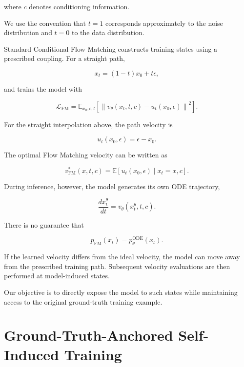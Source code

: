 \documentclass[11pt]{article}
\begin{document}
where $c$ denotes conditioning information.

We use the convention that $t=1$ corresponds approximately to the noise
distribution and $t=0$ to the data distribution.

Standard Conditional Flow Matching constructs training states using a prescribed
coupling. For a straight path,

\begin{equation}
x_t = (1-t)x_0+t\epsilon,
\end{equation}

and trains the model with

\begin{equation}
\mathcal{L}_{\mathrm{FM}}
=
\mathbb{E}_{x_0,\epsilon,t}
\left[
\left\|
v_\theta(x_t,t,c)
-
u_t(x_0,\epsilon)
\right\|^2
\right].
\end{equation}

For the straight interpolation above, the path velocity is

\begin{equation}
u_t(x_0,\epsilon)=\epsilon-x_0.
\end{equation}

The optimal Flow Matching velocity can be written as

\begin{equation}
v_{\mathrm{FM}}^*(x,t,c)
=
\mathbb{E}
\left[
u_t(x_0,\epsilon)
\mid x_t=x,c
\right].
\end{equation}

During inference, however, the model generates its own ODE trajectory,

\begin{equation}
\frac{d x_t^\theta}{dt}
=
v_\theta(x_t^\theta,t,c).
\end{equation}

There is no guarantee that

\begin{equation}
p_{\mathrm{FM}}(x_t)
=
p_\theta^{\mathrm{ODE}}(x_t).
\end{equation}

If the learned velocity differs from the ideal velocity, the model can move
away from the prescribed training path. Subsequent velocity evaluations are
then performed at model-induced states.

Our objective is to directly expose the model to such states while maintaining
access to the original ground-truth training example.

\section{Ground-Truth-Anchored Self-Induced Training}
\end{document}
